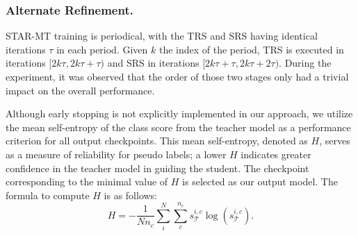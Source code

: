 \subsubsection{Alternate Refinement.} 
STAR-MT training is periodical, with the TRS and SRS having identical iterations $\tau$ in each period. Given $k$ the index of the period, TRS is executed in iterations $[2k\tau, 2k\tau+\tau)$ and SRS in iterations $[2k\tau+\tau, 2k\tau+2\tau)$. During the experiment, it was observed that the order of those two stages only had a trivial impact on the overall performance.

Although early stopping is not explicitly implemented in our approach, we utilize the mean self-entropy \cite{li2021free} of the class score from the teacher model as a performance criterion for all output checkpoints. This mean self-entropy, denoted as $H$, serves as a measure of reliability for pseudo labels; a lower $H$ indicates greater confidence in the teacher model in guiding the student. The checkpoint corresponding to the minimal value of $H$ is selected as our output model. The formula to compute $H$ is as follows:
\begin{equation}
    H  = -\frac{1}{Nn_{c}} \sum_{i}^{N}  \sum_{c}^{n_c} s_{\mathcal{T}}^{i,c} \log(s_{\mathcal{T}}^{i,c}).
\end{equation}